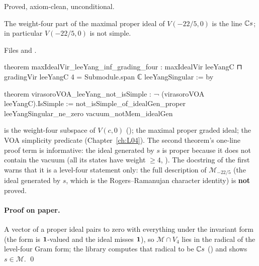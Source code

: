 \begin{status}
Proved, axiom-clean, unconditional.
\end{status}

\begin{theorem}\label{l19:thm:lylevel4}
The weight-four part of the maximal proper ideal of $V(-22/5,0)$ is the line ${\mathbb{C}} s$; in particular
$V(-22/5,0)$ is not simple.
\end{theorem}

\noindent Files  and
.
\begin{leancode}
theorem maxIdealVir_leeYang_inf_grading_four :
    maxIdealVir leeYangC ⊓ gradingVir leeYangC 4 = Submodule.span ℂ {leeYangSingular} := by

theorem virasoroVOA_leeYang_not_isSimple : ¬ (virasoroVOA leeYangC).IsSimple :=
  not_isSimple_of_idealGen_proper leeYangSingular_ne_zero vacuum_notMem_idealGen
\end{leancode}

\begin{dictionary}
 is the weight-four subspace of $V(c,0)$ ();
 the maximal proper graded ideal;  the VOA simplicity
predicate (Chapter~\ref{ch:L04}). The second theorem's one-line proof term is informative: the ideal
generated by $s$ is proper because it does not contain the vacuum (all its states have weight
$\ge4$, ). The docstring of the first warns that it is a level-four
statement only: the full description of $\mathcal M_{-22/5}$ (the ideal generated by $s$, which is the
Rogers--Ramanujan character identity) is \textbf{not} proved.
\end{dictionary}

\paragraph{Proof on paper.} A vector of a proper ideal pairs to zero with everything under the
invariant form (the form is $\mathbf{1}$-valued and the ideal misses $\mathbf{1}$), so
$\mathcal M\cap V_4$ lies in the radical of the level-four Gram form; the library computes that radical to
be ${\mathbb{C}} s$ (\allowbreak{}\allowbreak{}\allowbreak{}\allowbreak{}) and shows $s\in\mathcal M$. \qed

